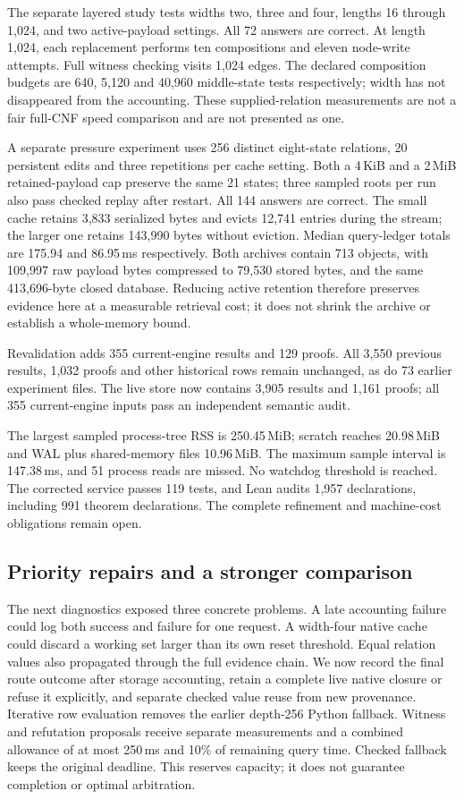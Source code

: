 \documentclass[11pt,a4paper]{article}
\numberwithin{equation}{section}
\theoremstyle{plain}
\theoremstyle{definition}
\theoremstyle{remark}
\begin{document}
The separate layered study tests widths two, three and four, lengths 16 through 1,024, and two active-payload settings. All 72 answers are correct. At length 1,024, each replacement performs ten compositions and eleven node-write attempts. Full witness checking visits 1,024 edges. The declared composition budgets are 640, 5,120 and 40,960 middle-state tests respectively; width has not disappeared from the accounting. These supplied-relation measurements are not a fair full-CNF speed comparison and are not presented as one.

A separate pressure experiment uses 256 distinct eight-state relations, 20 persistent edits and three repetitions per cache setting. Both a 4\,KiB and a 2\,MiB retained-payload cap preserve the same 21 states; three sampled roots per run also pass checked replay after restart. All 144 answers are correct. The small cache retains 3,833 serialized bytes and evicts 12,741 entries during the stream; the larger one retains 143,990 bytes without eviction. Median query-ledger totals are 175.94 and 86.95\,ms respectively. Both archives contain 713 objects, with 109,997 raw payload bytes compressed to 79,530 stored bytes, and the same 413,696-byte closed database. Reducing active retention therefore preserves evidence here at a measurable retrieval cost; it does not shrink the archive or establish a whole-memory bound.

Revalidation adds 355 current-engine results and 129 proofs. All 3,550 previous results, 1,032 proofs and other historical rows remain unchanged, as do 73 earlier experiment files. The live store now contains 3,905 results and 1,161 proofs; all 355 current-engine inputs pass an independent semantic audit.

The largest sampled process-tree RSS is 250.45\,MiB; scratch reaches 20.98\,MiB and WAL plus shared-memory files 10.96\,MiB. The maximum sample interval is 147.38\,ms, and 51 process reads are missed. No watchdog threshold is reached. The corrected service passes 119 tests, and Lean audits 1,957 declarations, including 991 theorem declarations. The complete refinement and machine-cost obligations remain open.

\subsection{Priority repairs and a stronger comparison}
\label{sec:priority-study}

The next diagnostics exposed three concrete problems. A late accounting failure could log both success and failure for one request. A width-four native cache could discard a working set larger than its own reset threshold. Equal relation values also propagated through the full evidence chain. We now record the final route outcome after storage accounting, retain a complete live native closure or refuse it explicitly, and separate checked value reuse from new provenance. Iterative row evaluation removes the earlier depth-256 Python fallback. Witness and refutation proposals receive separate measurements and a combined allowance of at most 250\,ms and 10\% of remaining query time. Checked fallback keeps the original deadline. This reserves capacity; it does not guarantee completion or optimal arbitration.
\end{document}
